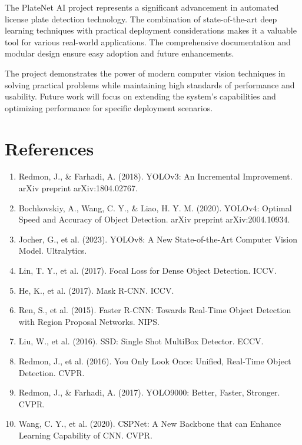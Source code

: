 \documentclass[12pt,a4paper]{article}
\begin{document}
The PlateNet AI project represents a significant advancement in automated license plate detection technology. The combination of state-of-the-art deep learning techniques with practical deployment considerations makes it a valuable tool for various real-world applications. The comprehensive documentation and modular design ensure easy adoption and future enhancements.

The project demonstrates the power of modern computer vision techniques in solving practical problems while maintaining high standards of performance and usability. Future work will focus on extending the system's capabilities and optimizing performance for specific deployment scenarios.

\section{References}

\begin{enumerate}
    \item Redmon, J., \& Farhadi, A. (2018). YOLOv3: An Incremental Improvement. arXiv preprint arXiv:1804.02767.
    \item Bochkovskiy, A., Wang, C. Y., \& Liao, H. Y. M. (2020). YOLOv4: Optimal Speed and Accuracy of Object Detection. arXiv preprint arXiv:2004.10934.
    \item Jocher, G., et al. (2023). YOLOv8: A New State-of-the-Art Computer Vision Model. Ultralytics.
    \item Lin, T. Y., et al. (2017). Focal Loss for Dense Object Detection. ICCV.
    \item He, K., et al. (2017). Mask R-CNN. ICCV.
    \item Ren, S., et al. (2015). Faster R-CNN: Towards Real-Time Object Detection with Region Proposal Networks. NIPS.
    \item Liu, W., et al. (2016). SSD: Single Shot MultiBox Detector. ECCV.
    \item Redmon, J., et al. (2016). You Only Look Once: Unified, Real-Time Object Detection. CVPR.
    \item Redmon, J., \& Farhadi, A. (2017). YOLO9000: Better, Faster, Stronger. CVPR.
    \item Wang, C. Y., et al. (2020). CSPNet: A New Backbone that can Enhance Learning Capability of CNN. CVPR.
\end{enumerate}
\end{document}
